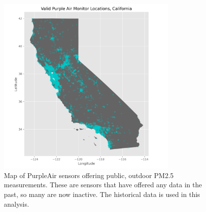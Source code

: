 \documentclass[12pt]{article}
\begin{document}

\FloatBarrier
\begin{figure}[ht]
\centering
\includegraphics[width=0.8\textwidth]{purple_air_sensor_map_california.png}
\caption{Map of PurpleAir sensors offering public, outdoor PM2.5 measurements. These are sensors that have offered any data in the past, so many are now inactive. The historical data is used in this analysis.}
\label{fig:ca_purpleair_map}
\end{figure}
\end{document}
